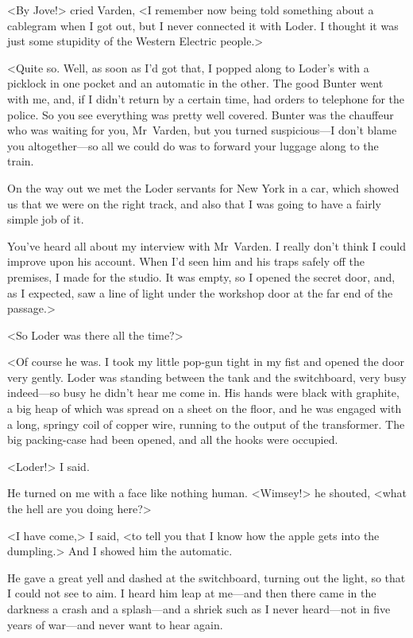 <By Jove!> cried Varden, <I remember now being told something about a cablegram when I got out, but I never connected it with Loder. I thought it was just some stupidity of the Western Electric people.>

<Quite so. Well, as soon as I'd got that, I popped along to Loder's with a picklock in one pocket and an automatic in the other. The good Bunter went with me, and, if I didn't return by a certain time, had orders to telephone for the police. So you see everything was pretty well covered. Bunter was the chauffeur who was waiting for you, Mr~Varden, but you turned suspicious—I don't blame you altogether—so all we could do was to forward your luggage along to the train.

On the way out we met the Loder servants  for New York in a car, which showed us that we were on the right track, and also that I was going to have a fairly simple job of it.

You've heard all about my interview with Mr~Varden. I really don't think I could improve upon his account. When I'd seen him and his traps safely off the premises, I made for the studio. It was empty, so I opened the secret door, and, as I expected, saw a line of light under the workshop door at the far end of the passage.>

<So Loder was there all the time?>

<Of course he was. I took my little pop-gun tight in my fist and opened the door very gently. Loder was standing between the tank and the switchboard, very busy indeed—so busy he didn't hear me come in. His hands were black with graphite, a big heap of which was spread on a sheet on the floor, and he was engaged with a long, springy coil of copper wire, running to the output of the transformer. The big packing-case had been opened, and all the hooks were occupied.

<Loder!> I said.

He turned on me with a face like nothing human. <Wimsey!> he shouted, <what the hell are you doing here?>

<I have come,> I said, <to tell you that I know how the apple gets into the dumpling.> And I showed him the automatic.

He gave a great yell and dashed at the switchboard, turning out the light, so that I could not see to aim. I heard him leap at me—and then there came in the darkness a crash and a splash—and a shriek such as I never heard—not in five years of war—and never want to hear again.

